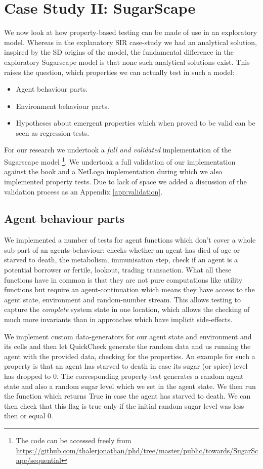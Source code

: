\section{Case Study II: SugarScape}
\label{sec:case_sug}
We now look at how property-based testing can be made of use in an exploratory model. Whereas in the explanatory SIR case-study we had an analytical solution, inspired by the SD origins of the model, the fundamental difference in the exploratory Sugarscape model is that none such analytical solutions exist. This raises the question, which properties we can actually test in such a model: 
\begin{itemize}
	\item Agent behaviour parts.
	\item Environment behaviour parts.
	\item Hypotheses about emergent properties which when proved to be valid can be seen as regression tests.
\end{itemize}

For our research we undertook a \textit{full and validated} implementation of the Sugarscape model \footnote{The code can be accessed freely from \url{https://github.com/thalerjonathan/phd/tree/master/public/towards/SugarScape/sequential}}. We undertook a full validation of our implementation against the book \cite{epstein_growing_1996} and a NetLogo implementation \cite{weaver_replicating_nodate} during which we also implemented property tests. Due to lack of space we added a discussion of the validation process as an Appendix \ref{app:validation}.

\subsection{Agent behaviour parts}
We implemented a number of tests for agent functions which don't cover a whole sub-part of an agents behaviour: checks whether an agent has died of age or starved to death, the metabolism, immunisation step, check if an agent is a potential borrower or fertile, lookout, trading transaction. What all these functions have in common is that they are not pure computations like utility functions but require an agent-continuation which means they have access to the agent state, environment and random-number stream. This allows testing to capture the \textit{complete} system state in one location, which allows the checking of much more invariants than in approaches which have implicit side-effects.

We implement custom data-generators for our agent state and environment and its cells and then let QuickCheck generate the random data and us running the agent with the provided data, checking for the properties. An example for such a property is that an agent has starved to death in case its sugar (or spice) level has dropped to 0. The corresponding property-test generates a random agent state and also a random sugar level which we set in the agent state. We then run the function which returns True in case the agent has starved to death. We can then check that this flag is true only if the initial random sugar level was less then or equal 0.


